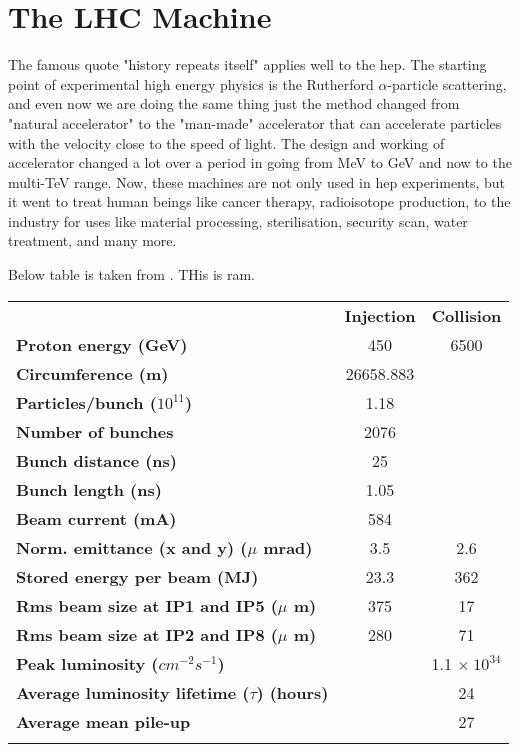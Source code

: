 \chapter{The LHC Machine}

The famous quote "history repeats itself" applies well to the \acrfull{hep}. The starting point of experimental high energy physics is the Rutherford $\alpha$-particle scattering, and even now we are doing the same thing just the method changed from "natural accelerator" to the "man-made" accelerator that can accelerate particles with the velocity close to the speed of light. The design and working of accelerator changed a lot over a period in going from MeV to GeV and now to the multi-TeV range. Now, these machines are not only used in \acrshort{hep} experiments, but it went to treat human beings like cancer therapy, radioisotope production,  to the industry for uses like material processing, sterilisation, security scan, water treatment, and many more. 



Below table is taken from \cite{Schoerner-Sadenius2015, LHC-parameters-2016, LHC-tdr}. THis is ram.


\begin{tabularx}{\textwidth}{|l c c|}
    \hhline{---}
    {\bf } \cellcolor[gray]{.8}& {\bf Injection} \cellcolor[gray]{.8}& {\bf Collision}\cellcolor[gray]{.8} \\
    \hhline{---}
    {\bf Proton energy (GeV)} & 450 & 6500\\
    \hhline{---}
    {\bf Circumference (m)} &  26658.883 & \\
    \hhline{---}
    {\bf Particles/bunch ($10^{11}$)}& 1.18 &  \\
    \hhline{---}
    {\bf Number of bunches} &   2076 &  \\
    \hhline{---}
    {\bf Bunch distance (ns)}   &  25 &   \\
    \hhline{---}
    {\bf Bunch length (ns)} &    1.05 & \\
    \hhline{---}
    {\bf Beam current (mA)} &   584 &   \\
    \hhline{---}
    {\bf Norm. emittance (x and y) ($\mu$ mrad)}  &  3.5 &  2.6 \\
    \hhline{---}
    {\bf Stored energy per beam (MJ)}   &  23.3 &  362 \\
    \hhline{---}
    {\bf Rms beam size at IP1 and IP5 ($\mu$ m)}  &  375 &  17 \\
    \hhline{---}
    {\bf Rms beam size at IP2 and IP8 ($\mu$ m)}  &  280 &  71 \\
    \hhline{---}
    {\bf Peak luminosity ($cm^{-2}s^{-1}$)}   &   & 1.1 $\times ~ 10^{34}$  \\
    \hhline{---}
    {\bf Average luminosity lifetime ($\tau$) (hours)} &    &   24 \\
    \hhline{---}
    {\bf Average mean pile-up}  &   &   27  \\
    \hhline{---}
\end{tabularx}

